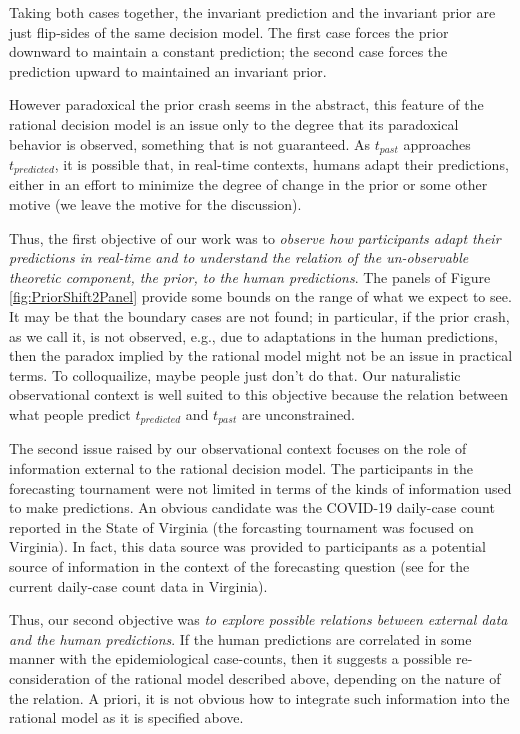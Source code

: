 \documentclass[a4paper,man,natbib]{apa6}
\begin{document}
Taking both cases together, the invariant prediction and the invariant prior are just flip-sides of the same decision model. The first case forces the prior downward to maintain a constant prediction; the second case forces the prediction upward to maintained an invariant prior. 

However paradoxical the prior crash seems in the abstract, this feature of the rational decision model is an issue only to the degree that its paradoxical behavior is observed, something that is not guaranteed. As $t_{past}$ approaches $t_{predicted}$, it is possible that, in real-time contexts, humans adapt their predictions, either in an effort to minimize the degree of change in the prior or some other motive (we leave the motive for the discussion). 

Thus, the first objective of our work was to \textit{observe how participants adapt their predictions in real-time and to understand the relation of the  un-observable theoretic component, the prior, to the human predictions}.  The panels of Figure \ref{fig:PriorShift2Panel} provide some bounds on the range of what we expect to see. It may be that the boundary cases are not found; in particular, if the prior crash, as we call it, is not observed, e.g., due to adaptations in the human predictions, then the paradox implied by the rational model might not be an issue in practical terms. To colloquailize, maybe people just don't do that.  Our naturalistic observational context is well suited to this objective because the relation between what people predict $t_{predicted}$ and $t_{past}$ are unconstrained.

The second issue raised by our observational context focuses on the role of information external to the rational decision model.  The participants in the forecasting tournament were not limited in terms of the kinds of information used to make predictions.  An obvious candidate was the COVID-19 daily-case count reported in the State of Virginia (the forcasting tournament was focused on Virginia). In fact, this data source was provided to participants as a potential source of information in the context of the forecasting question (see \cite{VDHOnline} for the current daily-case count data in Virginia). 

Thus, our second objective was \textit{to explore possible relations between external data and the human predictions}. If the human predictions are correlated in some manner with the epidemiological case-counts, then it suggests a possible re-consideration of the rational model described above, depending on the nature of the relation.  A priori, it is not obvious how to integrate such information into the rational model as it is specified above.
\end{document}
